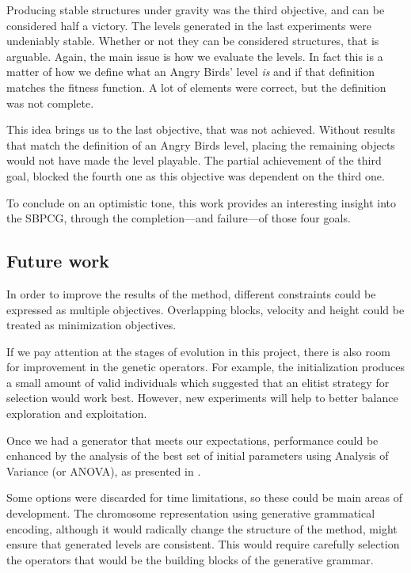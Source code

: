Producing stable structures under gravity was the third objective, and can be considered half a victory. The levels generated in the last experiments were undeniably stable. Whether or not they can be considered structures, that is arguable. Again, the main issue is how we evaluate the levels. In fact this is a matter of how we define what an Angry Birds' level \textit{is} and if that definition matches the fitness function. A lot of elements were correct, but the definition was not complete.

This idea brings us to the last objective, that was not achieved. Without results that match the definition of an Angry Birds level, placing the remaining objects would not have made the level playable. The partial achievement of the third goal, blocked the fourth one as this objective was dependent on the third one.

To conclude on an optimistic tone, this work provides an interesting insight into the SBPCG, through the completion---and failure---of those four goals.

\subsection{Future work}

In order to improve the results of the method, different constraints could be expressed as multiple objectives. Overlapping blocks, velocity and height could be treated as minimization objectives.

If we pay attention at the stages of evolution in this project, there is also room for improvement in the genetic operators. For example, the initialization produces a small amount of valid individuals which suggested that an elitist strategy for selection would work best. However, new experiments will help to better balance exploration and exploitation. 

Once we had a generator that meets our expectations, performance could be enhanced by the analysis of the best set of initial parameters using Analysis of Variance (or ANOVA), as presented in \cite{estevez2017statistical}. 

Some options were discarded for time limitations, so these could be main areas of development. The chromosome representation using generative grammatical encoding\cite{hornby2001advantages}, although it would radically change the structure of the method, might ensure that generated levels are consistent. This would require carefully selection the operators that would be the building blocks of the generative grammar.

